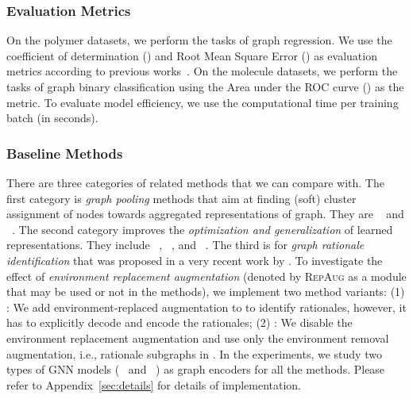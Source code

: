 \documentclass[sigconf]{acmart}
\begin{document}
\vspace{-0.03in}
\subsubsection{Evaluation Metrics} On the polymer datasets, we perform the tasks of graph regression. We use the coefficient of determination (\regreRSquare) and Root Mean Square Error (\regreRMSE) as evaluation metrics according to previous works~\cite{ma2020pi1m,hu2020open}.
On the molecule datasets, we perform the tasks of graph binary classification using the Area under the ROC curve (\classifyAUC) as the metric.
To evaluate model efficiency, we use the computational time per training batch (in seconds).

\vspace{-0.03in}
\subsubsection{Baseline Methods}
There are three categories of related methods that we can compare \method with. The first category is \emph{graph pooling} methods that aim at finding (soft) cluster assignment of nodes towards aggregated representations of graph. They are \unets~\cite{gao2021graph} and \selfattn~\cite{lee2019self}.
The second category improves the \emph{optimization and generalization} of learned representations. They include \stablegnn~\cite{fan2021generalizing}, \oodgnn~\cite{li2021ood}, and \irm~\cite{arjovsky2019invariant}.
The third is \dir for \emph{graph rationale identification} that was proposed in a very recent work by \citet{wu2022discovering}.
To investigate the effect of \emph{environment replacement augmentation} (denoted by \textsc{RepAug} as a module that may be used or not in the methods), we implement two method variants: (1) \dirplusaug: We add environment-replaced augmentation to \dir \cite{wu2022discovering} to identify rationales, however, it has to explicitly decode and encode the rationales; (2) \methodnoaug: We disable the environment replacement augmentation and use only the environment removal augmentation, i.e., rationale subgraphs in \method. 
In the experiments, we study two types of GNN models (\gcn~\cite{kipf2017semi} and \gin~\cite{xu2018how}) as graph encoders for all the methods. Please refer to Appendix~\ref{sec:details} for details of implementation.
\end{document}
